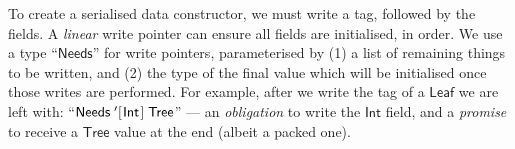 \documentclass[acmsmall,screen]{acmart}\settopmatter{}
\newcommand{\Conid}[1]{\mathit{#1}}
\renewcommand\Conid[1]{\mathord{\textsf{#1}}}
\begin{document}
To create a serialised data constructor, we must write a tag, followed by the
fields.
%
A {\em linear} write pointer can ensure all fields are initialised, in order.
We use a type ``\ensuremath{\Conid{Needs}}'' for write pointers, parameterised by (1) a
list of remaining things to be written, and (2) the type of the final value
which will be initialised once those writes are performed.  For example, after
we write the tag of a \ensuremath{\Conid{Leaf}} we are left with:
``\ensuremath{\Conid{Needs}\mathop{{\kern 1pt}'}[\mskip1.5mu \Conid{Int}\mskip1.5mu]\;\Conid{Tree}}'' ---
an {\em obligation} to write the \ensuremath{\Conid{Int}} field, and a {\em promise} to receive
a \ensuremath{\Conid{Tree}} value at the end (albeit a packed one).
\end{document}
